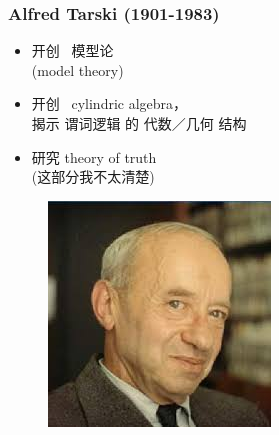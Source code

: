 \documentclass[15pt]{beamer}
\begin{document}
\begin{frame}
\frametitle{Alfred Tarski (1901-1983)}
\begin{minipage}[t]{0.62\linewidth}
	\begin{itemize}
		\item 开创 {\color{red} \ 模型论} \\ (model theory)
		\item 开创 {\color{red} \ cylindric algebra}， \\
		揭示 谓词逻辑 的 代数／几何 结构
		\item 研究 theory of truth \\
		(这部分我不太清楚)
	\end{itemize}
\end{minipage}
\hfill
\begin{minipage}[t]{0.35\linewidth}
	\begin{figure}[H]
		\includegraphics[scale=0.5]{Tarski.jpg}
	\end{figure}
\end{minipage}
\end{frame}
\end{document}
